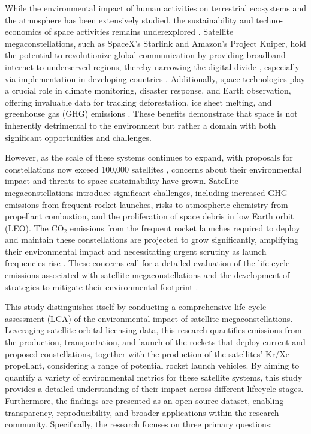 \documentclass[pdflatex,sn-mathphys-num]{sn-jnl}
\theoremstyle{thmstyleone}%
\theoremstyle{thmstyletwo}%
\theoremstyle{thmstylethree}%
\begin{document}
While the environmental impact of human activities on terrestrial ecosystems and the atmosphere has been extensively studied, the sustainability and techno-economics of space activities remains underexplored \citep{osoro_techno-economic_2021}. Satellite megaconstellations, such as SpaceX's Starlink and Amazon's Project Kuiper, hold the potential to revolutionize global communication by providing broadband internet to underserved regions, thereby narrowing the digital divide \citep{del_portillo_technical_2019, giannopapa_space_2022}, especially via implementation in developing countries \citep{wood_charting_2012}. Additionally, space technologies play a crucial role in climate monitoring, disaster response, and Earth observation, offering invaluable data for tracking deforestation, ice sheet melting, and greenhouse gas (GHG) emissions \citep{wentz_precise_2000, dinas_innovative_2015}. These benefits demonstrate that space is not inherently detrimental to the environment but rather a domain with both significant opportunities and challenges.

However, as the scale of these systems continues to expand, with proposals for constellations now exceed 100,000 satellites \citep{falle_one_2023}, concerns about their environmental impact and threats to space sustainability have grown. Satellite megaconstellations introduce significant challenges, including increased GHG emissions from frequent rocket launches, risks to atmospheric chemistry from propellant combustion, and the proliferation of space debris in low Earth orbit (LEO). The CO$_2$ emissions from the frequent rocket launches required to deploy and maintain these constellations are projected to grow significantly, amplifying their environmental impact and necessitating urgent scrutiny as launch frequencies rise \citep{dallas_environmental_2020}. These concerns call for a detailed evaluation of the life cycle emissions associated with satellite megaconstellations and the development of strategies to mitigate their environmental footprint \citep{osoro_sustainability_2024}.

This study distinguishes itself by conducting a comprehensive life cycle assessment (LCA) of the environmental impact of satellite megaconstellations. Leveraging satellite orbital licensing data, this research quantifies emissions from the production, transportation, and launch of the rockets that deploy current and proposed constellations, together with the production of the satellites' Kr/Xe propellant, considering a range of potential rocket launch vehicles. By aiming to quantify a variety of environmental metrics for these satellite systems, this study provides a detailed understanding of their impact across different lifecycle stages. Furthermore, the findings are presented as an open-source dataset, enabling transparency, reproducibility, and broader applications within the research community. Specifically, the research focuses on three primary questions:
\end{document}
